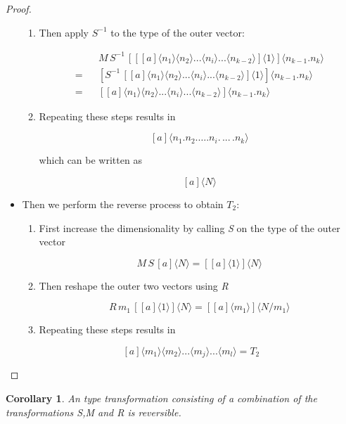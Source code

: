 \documentclass{article}
\newtheorem{corollary}{Corollary}
\begin{document}
\begin{proof}
\begin{itemize}
\begin{enumerate}
\item Then apply $S^{-1}$ to the type of the outer vector:


\begin{eqnarray*}
 &  & M\, S^{-1}\,[[[a]\langle n_{1}\rangle\langle n_{2}\rangle...\langle n_{i}\rangle...\langle n_{k-2}\rangle]\langle1\rangle]\langle n_{k-1}.n_{k}\rangle\\
= &  & [S^{-1}\,[[a]\langle n_{1}\rangle\langle n_{2}\rangle...\langle n_{i}\rangle...\langle n_{k-2}\rangle]\langle1\rangle]\langle n_{k-1}.n_{k}\rangle\\
= &  & [[a]\langle n_{1}\rangle\langle n_{2}\rangle...\langle n_{i}\rangle...\langle n_{k-2}\rangle]\langle n_{k-1}.n_{k}\rangle
\end{eqnarray*}
 

\item Repeating these steps results in


\[
[a]\langle n_{1}.n_{2}.\ldots.n_{i}.\,...\,.n_{k}\rangle
\]



which can be written as


\[
[a]\langle N\rangle
\]


\end{enumerate}
\item Then we perform the reverse process to obtain $T_{2}$:

\begin{enumerate}
\item First increase the dimensionality by calling \emph{S} on the type
of the outer vector


\[
M\, S\,[a]\langle N\rangle=[[a]\langle1\rangle]\langle N\rangle
\]


\item Then reshape the outer two vectors using \emph{R}


\[
R\, m_{1}\,[[a]\langle1\rangle]\langle N\rangle=[[a]\langle m_{1}\rangle]\langle N/m_{1}\rangle
\]


\item Repeating these steps results in
\end{enumerate}

\[
[a]\langle m_{1}\rangle\langle m_{2}\rangle...\langle m{}_{j}\rangle...\langle m_{l}\rangle=T_{2}
\]


\end{itemize}
\end{proof}

\begin{corollary} 
An type transformation consisting of a combination of the transformations \emph{S},\emph{M} and \emph{R} is reversible.
\end{corollary} 
\end{document}

